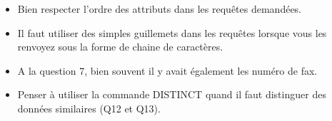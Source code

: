 \begin{itemize}
\item Bien respecter l'ordre des attributs dans les requêtes demandées.
\item Il faut utiliser des simples guillemets dans les requêtes lorsque vous les renvoyez sous la forme de chaine de caractères.
\item A la question 7, bien souvent il y avait également les numéro de fax.
\item Penser à utiliser la commande DISTINCT quand il faut distinguer des données similaires (Q12 et Q13).
\end{itemize}
